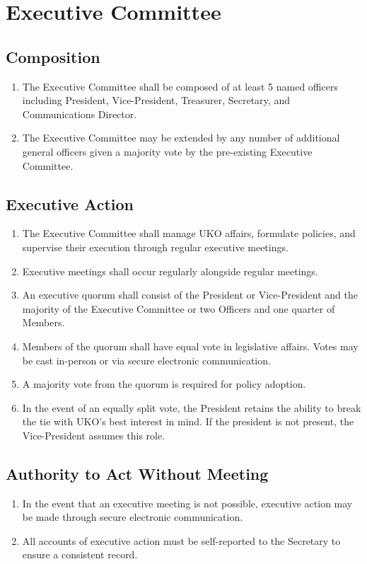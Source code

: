 \documentclass[12pt,executivepaper]{article}
\begin{document}
\section{Executive Committee}

\subsection{Composition}
\begin{enumerate}
    \item The Executive Committee shall be composed of at least 5 named officers including
          President, Vice-President, Treasurer, Secretary, and Communications Director. 
    \item The Executive Committee may be extended by any number of additional general officers
          given a majority vote by the pre-existing Executive Committee.
\end{enumerate}

\subsection{Executive Action}
\begin{enumerate}
    \item The Executive Committee shall manage UKO affairs, formulate policies, and supervise
          their execution through regular executive meetings.
    \item Executive meetings shall occur regularly alongside regular meetings.
    \item An executive quorum shall consist of the President or Vice-President and the
          majority of the Executive Committee or two Officers and one quarter of Members.
    \item Members of the quorum shall have equal vote in legislative affairs.
          Votes may be cast in-person or via secure electronic communication.
    \item A majority vote from the quorum is required for policy adoption.
    \item In the event of an equally split vote, the President retains the ability to
          break the tie with UKO's best interest in mind. If the president is not present,
          the Vice-President assumes this role.
\end{enumerate}

\subsection{Authority to Act Without Meeting}
\begin{enumerate}
    \item In the event that an executive meeting is not possible, executive action
          may be made through secure electronic communication.
    \item All accounts of executive action must be self-reported to the
          Secretary to ensure a consistent record.
\end{enumerate}
\end{document}
